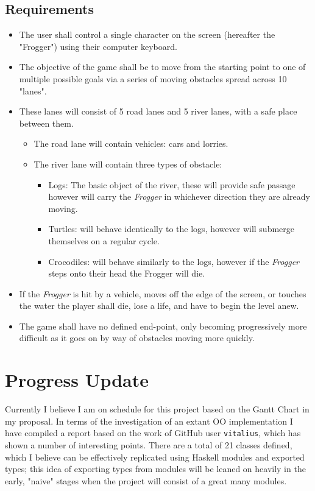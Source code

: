 \documentclass[12pt, a4paper]{report}
\begin{document}
\subsection{Requirements}
\begin{itemize}
  \item The user shall control a single character on the screen (hereafter the "Frogger") using their computer keyboard.
  \item The objective of the game shall be to move from the starting point to one of multiple possible goals via a series of moving obstacles spread across 10 "lanes".
  \item These lanes will consist of 5 road lanes and 5 river lanes, with a safe place between them.
    \begin{itemize}
      \item The road lane will contain vehicles: cars and lorries.
      \item The river lane will contain three types of obstacle:
        \begin{itemize}
          \item Logs: The basic object of the river, these will provide safe passage however will carry the \textit{Frogger} in whichever direction they are already moving.
          \item Turtles: will behave identically to the logs, however will submerge themselves on a regular cycle.
          \item Crocodiles: will behave similarly to the logs, however if the \textit{Frogger} steps onto their head the Frogger will die.
        \end{itemize}
    \end{itemize}
  \item If the \textit{Frogger} is hit by a vehicle, moves off the edge of the screen, or touches the water the player shall die, lose a life, and have to begin the level anew.
  \item The game shall have no defined end-point, only becoming progressively more difficult as it goes on by way of obstacles moving more quickly.
\end{itemize}

\section{Progress Update}
Currently I believe I am on schedule for this project based on the Gantt Chart in my proposal.
In terms of the investigation of an extant OO implementation I have compiled a report based on the work of GitHub user \verb|vitalius|, which has shown a number of interesting points.
There are a total of 21 classes defined, which I believe can be effectively replicated using Haskell modules and exported types; this idea of exporting types from modules will be leaned on heavily in the early, "naive" stages when the project will consist of a great many modules.
\end{document}
